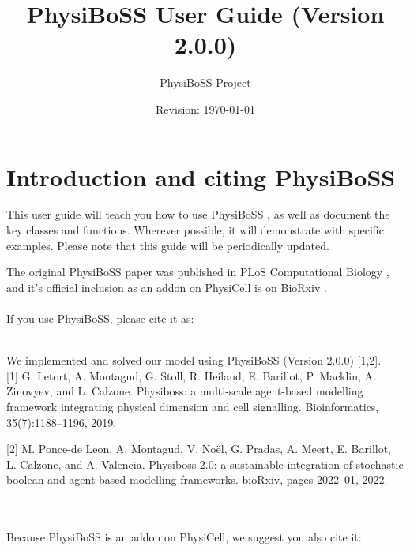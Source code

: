 \documentclass[12pt]{article}
\newcommand{\Version}{2.0.0}
\newcommand{\blue}[1]{\textcolor{blue}{#1}}
\newcommand{\DONE}{}%
\begin{document}
\author{PhysiBoSS Project}
\title{PhysiBoSS User Guide (Version \Version)}
\date{Revision: \today}

\maketitle

\setlength{\parskip}{0in}
\hypertarget{TOC}{}
\tableofcontents
\setlength{\parskip}{8pt}

\section{Introduction and citing PhysiBoSS \DONE}
This user guide will teach you how to use PhysiBoSS \cite{letort2019physiboss, ponce2022physiboss}, as well as document the key classes and functions. Wherever possible, it will demonstrate with specific examples. Please note that this guide will be periodically updated. 

The original PhysiBoSS paper was published in PLoS Computational Biology \cite{letort2019physiboss}, and it's official inclusion as an addon on PhysiCell\cite{ref:PhysiCell} is on BioRxiv \cite{ponce2022physiboss}. \\
\\
If you use PhysiBoSS, please cite it as: \\
\\
\phantom{ }\hspace{.075\textwidth}\parbox[top]{0.85\textwidth}{%
We implemented and solved our model using PhysiBoSS (Version \Version) [1,2]. \\

[1] G. Letort, A. Montagud, G. Stoll, R. Heiland, E. Barillot, P. Macklin, A. Zinovyev, and L. Calzone.
Physiboss: a multi-scale agent-based modelling framework integrating physical dimension and cell
signalling. Bioinformatics, 35(7):1188–1196, 2019.


[2] M. Ponce-de Leon, A. Montagud, V. Noël, G. Pradas, A. Meert, E. Barillot, L. Calzone, and A. Valencia.
Physiboss 2.0: a sustainable integration of stochastic boolean and agent-based modelling frameworks.
bioRxiv, pages 2022–01, 2022.

}\\
\\

Because PhysiBoSS is an addon on PhysiCell, we suggest you also cite it:  
\end{document}
